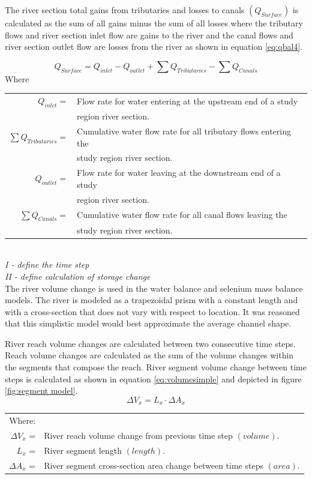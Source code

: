 \begin{linenumbers}
The river section total gains from tributaries and losses to canals $(Q_{Surface})$ is calculated as the sum of all gains minus the sum of all losses where the tributary flows and river section inlet flow are gains to the river and the canal flows and river section outlet flow are losses from the river as shown in equation \ref{eq:qbal4}.  

\begin{equation}
	Q_{Surface} = Q_{inlet} - Q_{outlet} + \sum Q_{Tributaries} - \sum Q_{Canals}
	\label{eq:qbal4}
\end{equation}
Where\\
\begin{tabular}{rl}
$Q_{inlet} =$& Flow rate for water entering at the upstream end of a study \\
&region river section.\\
$\sum Q_{Tributaries} =$& Cumulative water flow rate for all tributary flows entering the \\
&study region river section.\\
$Q_{outlet} =$& Flow rate for water leaving at the downstream end of a study \\
&region river section.\\
$\sum Q_{Canals} =$& Cumulative water flow rate for all canal flows leaving the \\
&study region river section.\\
\end{tabular}\\

\emph{I - define the time step}\\

\emph{II - define calculation of storage change}\\
The river volume change is used in the water balance and selenium mass balance models.  The river is modeled as a trapezoidal prism with a constant length and with a cross-section that does not vary with respect to location.  It was reasoned that this simplistic model would best approximate the average channel shape.  

River reach volume changes are calculated between two consecutive time steps.  Reach volume changes are calculated as the sum of the volume changes within the segments that compose the reach.  River segment volume change between time steps is calculated as shown in equation \ref{eq:volumesimple} and depicted in figure \ref{fig:segment model}.
\begin{equation}
	\Delta V_x=L_x \cdot \Delta A_{x}
	\label{eq:volumesimple}
\end{equation}
\begin{tabular}{r l}
	Where:&\\
	$\Delta V_x$ =&River reach volume change from previous time step $(volume)$.\\
	$L_x$ =&River segment length $(length)$.\\
	$\Delta A_{x}$ =& River segment cross-section area change between time steps $(area)$.\\
\end{tabular}\\


\end{linenumbers}
